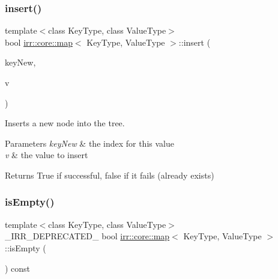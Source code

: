 \subsubsection{\texorpdfstring{insert()}{insert()}\hspace{0.1cm}{\footnotesize\ttfamily [2/2]}}
{\footnotesize\ttfamily template$<$class Key\+Type, class Value\+Type$>$ \\
bool \hyperlink{classirr_1_1core_1_1map}{irr\+::core\+::map}$<$ Key\+Type, Value\+Type $>$\+::insert (\begin{DoxyParamCaption}\item[{const Key\+Type \&}]{key\+New,  }\item[{const Value\+Type \&}]{v }\end{DoxyParamCaption})\hspace{0.3cm}{\ttfamily [inline]}}



Inserts a new node into the tree. 


\begin{DoxyParams}{Parameters}
{\em key\+New} & the index for this value \\
\hline
{\em v} & the value to insert \\
\hline
\end{DoxyParams}
\begin{DoxyReturn}{Returns}
True if successful, false if it fails (already exists) 
\end{DoxyReturn}
\mbox{\label{classirr_1_1core_1_1map_a2a5b309f8737e2aca9668e32c71f05ed}} 
\subsubsection{\texorpdfstring{is\+Empty()}{isEmpty()}\hspace{0.1cm}{\footnotesize\ttfamily [1/2]}}
{\footnotesize\ttfamily template$<$class Key\+Type, class Value\+Type$>$ \\
\+\_\+\+I\+R\+R\+\_\+\+D\+E\+P\+R\+E\+C\+A\+T\+E\+D\+\_\+ bool \hyperlink{classirr_1_1core_1_1map}{irr\+::core\+::map}$<$ Key\+Type, Value\+Type $>$\+::is\+Empty (\begin{DoxyParamCaption}{ }\end{DoxyParamCaption}) const\hspace{0.3cm}{\ttfamily [inline]}}

